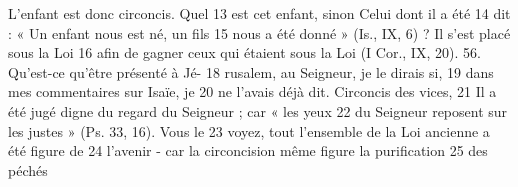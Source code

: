 L'enfant est donc circoncis. Quel	 
13	 	est cet enfant, sinon Celui dont il a été	 
14	 	dit : « Un enfant nous est né, un fils	 
15	 	nous a été donné » (Is., IX, 6) ? Il s'est placé sous la Loi	 
16	 	afin de gagner ceux qui étaient sous la Loi (I Cor., IX, 20).
	56. Qu'est-ce qu'être présenté à Jé-	 
18	 	rusalem, au Seigneur, je le dirais si,	 
19	 	dans mes commentaires sur Isaïe, je	 
20	 	ne l'avais déjà dit. Circoncis des vices,	 
21	 	Il a été jugé digne du regard du Seigneur ; car « les yeux	 
22	 	du Seigneur reposent sur les justes » (Ps. 33, 16). Vous le	 
23	 	voyez, tout l'ensemble de la Loi ancienne a été figure de	 
24	 	l'avenir - car la circoncision même figure la purification	 
25	 	des péchés